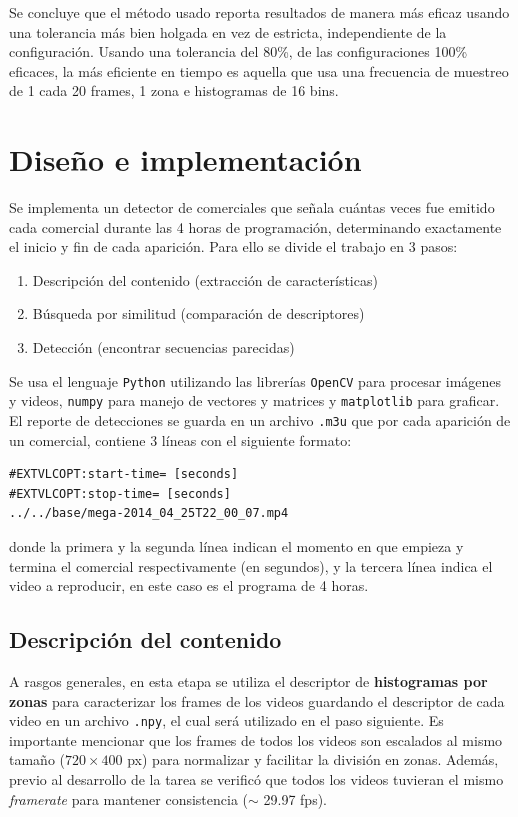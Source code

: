 \documentclass[14pt,letterpaper,hidelinks]{extarticle}
\begin{document}
Se concluye que el método usado reporta resultados de manera más eficaz usando una tolerancia más bien holgada en vez de estricta, independiente de la configuración. Usando una tolerancia del 80\%, de las configuraciones 100\% eficaces, la más eficiente en tiempo es aquella que usa una frecuencia de muestreo de 1 cada 20 frames, 1 zona e histogramas de 16 bins.

\section{Diseño e implementación}
Se implementa un detector de comerciales que señala cuántas veces fue emitido cada comercial durante las 4 horas de programación, determinando exactamente el inicio y
fin de cada aparición. Para ello se divide el trabajo en 3 pasos: 
\begin{enumerate}
\item Descripción del contenido (extracción de características)
\item Búsqueda por similitud (comparación de descriptores)
\item Detección (encontrar secuencias parecidas)
\end{enumerate}

Se usa el lenguaje \verb+Python+ utilizando las librerías \verb+OpenCV+ para procesar imágenes y videos, \verb+numpy+ para manejo de vectores y matrices y \verb+matplotlib+ para graficar.\\

El reporte de detecciones se guarda en un archivo \verb+.m3u+ que por cada aparición de un comercial, contiene 3 líneas con el siguiente formato: 
\begin{verbatim}
#EXTVLCOPT:start-time= [seconds]
#EXTVLCOPT:stop-time= [seconds]
../../base/mega-2014_04_25T22_00_07.mp4
\end{verbatim}
donde la primera y la segunda línea indican el momento en que empieza y termina el comercial respectivamente (en segundos), y la tercera línea indica el video a reproducir, en este caso es el programa de 4 horas.\\

\subsection{Descripción del contenido}
A rasgos generales, en esta etapa se utiliza el descriptor de \textbf{histogramas por zonas} para caracterizar los frames de los videos guardando el descriptor de cada video en un archivo \verb+.npy+, el cual será utilizado en el paso siguiente. Es importante mencionar que los frames de todos los videos son escalados al mismo tamaño ($720\times400$ px) para normalizar y facilitar la división en zonas. Además, previo al desarrollo de la tarea se verificó que todos los videos tuvieran el mismo \textit{framerate} para mantener consistencia ($\sim$ 29.97 fps).\\
\end{document}
